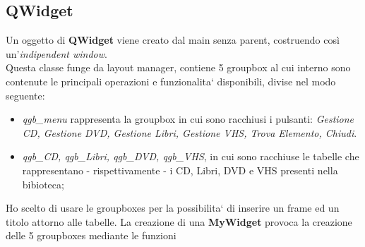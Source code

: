 {	\subsection{QWidget}{
		Un oggetto di \textbf{QWidget} viene creato dal main senza parent, costruendo così un'\textit{indipendent window}. \\
		Questa classe funge da layout manager, contiene 5 groupbox al cui interno sono contenute le principali operazioni e funzionalita` disponibili, divise nel modo seguente:
	\begin{itemize}\itemsep=0.5pt
		\item \textit{qgb\_menu} rappresenta la groupbox in cui sono racchiusi i pulsanti:
			\textit{Gestione CD, Gestione DVD, Gestione Libri, Gestione VHS, Trova Elemento, Chiudi}.
		\item \textit{qgb\_CD, qgb\_Libri, qgb\_DVD, qgb\_VHS}, in cui sono racchiuse le tabelle che rappresentano - rispettivamente - i CD, Libri, DVD e VHS presenti nella bibioteca;
	\end{itemize}
	Ho scelto di usare le groupboxes per la possibilita` di inserire un frame ed un titolo attorno alle tabelle.
	La creazione di una \textbf{MyWidget} provoca la creazione delle 5 groupboxes mediante le funzioni \textit{}
	}
}
